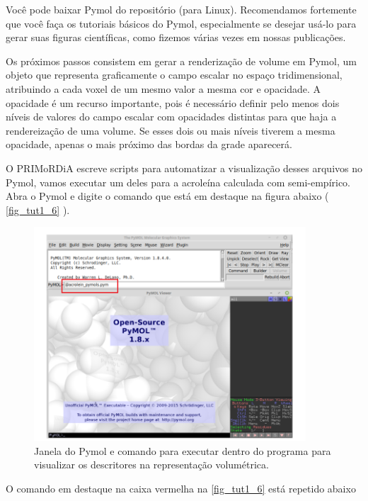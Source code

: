 \documentclass[a4paper,11pt]{refart}
\begin{document}
Você pode baixar Pymol do repositório (para Linux). Recomendamos fortemente que você faça os tutoriais básicos do Pymol, especialmente se desejar usá-lo para gerar suas figuras científicas, como fizemos várias vezes em nossas publicações. 

Os próximos passos consistem em gerar a renderização de volume em Pymol, um objeto que representa graficamente o campo escalar no espaço tridimensional, atribuindo a cada voxel de um mesmo valor a mesma cor e opacidade. A opacidade é um recurso importante, pois é necessário  definir pelo menos dois níveis de valores do campo escalar com opacidades distintas para que haja a rendereização de uma volume. Se esses dois ou mais níveis tiverem a mesma opacidade, apenas o mais próximo das bordas da grade aparecerá. 

O PRIMoRDiA escreve scripts para automatizar a visualização desses arquivos no Pymol, vamos executar um deles para a acroleína calculada com semi-empírico. Abra o Pymol e digite o comando que está em destaque na figura abaixo ( \autoref{fig_tut1_6} ). 

\hspace*{-\leftmarginwidth}
\begin{minipage}{\fullwidth}
\begin{figure}[H]
\begin{center}
\includegraphics[width=4in]{images/img7}
\caption{Janela do Pymol e comando para executar dentro do programa para visualizar os descritores na representação volumétrica.}
\label{fig_tut1_6}
\end{center}
\end{figure}
\end{minipage}

O comando em destaque na caixa vermelha na \autoref{fig_tut1_6} está repetido abaixo
\end{document}
